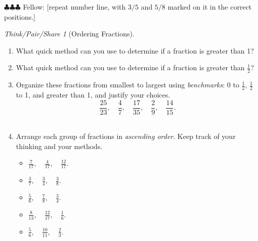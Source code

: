 \documentclass[10pt, reqno]{amsart}
\theoremstyle{remark}
\newtheorem*{thinkpair*}{Think/Pair/Share}
\theoremstyle{definition}
\numberwithin{equation}{section}  %
\newcommand{\fellow}[1]{{\color{magenta} \sf $\clubsuit\clubsuit\clubsuit$ Fellow: [#1]}}
\begin{document}
\fellow{repeat number line, with $3/5$ and $5/8$ marked on it in the correct positions.}


\begin{thinkpair*}[Ordering Fractions]\ 
\begin{enumerate}
\item
What quick method can you use to determine if a fraction is greater than 1?\\

\item
What quick method can you use to determine if a fraction is greater than $\displaystyle \frac 1 2$?\\

\item
Organize these fractions from smallest to largest using \emph{benchmarks}: 0 to $\frac 1 2$, $\frac 1 2$ to 1, and greater than 1, and justify your choices.
\[
\frac{25}{23},\quad  \frac{4}{7}, \quad \frac{17}{35}, \quad \frac{2}{9},  \quad \frac{14}{15}.
\]\\

\item
Arrange each group of fractions in \emph{ascending order}.  Keep track of your thinking and your methods.

\begin{itemize}
\item
$\displaystyle
\frac{7}{17},\quad  \frac{4}{17}, \quad \frac{12}{17}.
$\\

\item
$\displaystyle
\frac{3}{7},\quad  \frac{3}{4}, \quad \frac{3}{8}.
$\\

\item
$\displaystyle
\frac{5}{6},\quad  \frac{7}{8}, \quad \frac{3}{4}.
$\\

\item
$\displaystyle
\frac{8}{13},\quad  \frac{12}{17}, \quad \frac{1}{6}.
$\\


\item
$\displaystyle
\frac{5}{6},\quad  \frac{10}{11}, \quad \frac{2}{3}.
$\\

\end{itemize}

\end{enumerate}



\end{thinkpair*}
\end{document}
